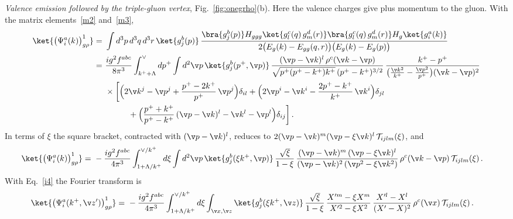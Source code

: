 \emph{Valence emission followed by the triple-gluon vertex}, Fig.~\ref{fig:onegrho}(b). Here the valence
charges give plus momentum to the gluon. With the matrix elements~\eqref{m2} and~\eqref{m3},
\begin{align}\label{onegrho1}
\ket{\big(\Psi^{a}_{i}(k)\big)^{1}_{g\rho}}
=\ &\int d^{3}p\,d^{3}q\,d^{3}r\,\ket{g^{b}_{j}(p)}\,
\frac{\bra{g^{b}_{j}(p)}H_{ggg}\ket{g^{c}_{l}(q)\,g^{d}_{m}(r)}\bra{g^{c}_{l}(q)\,g^{d}_{m}(r)}H_{g}\ket{g^{a}_{i}(k)}}
{2\big(E_{g}(k)-E_{gg}(q,r)\big)\big(E_{g}(k)-E_{g}(p)\big)}\\
=\ &\frac{ig^{2}f^{abc}}{8\pi^{3}}\int_{k^{+}+\Lambda}^{\vee}dp^{+}\int d^{2}\v p\,\ket{g^{b}_{j}(p^{+},\v p)}\,
\frac{(\v p-\v k)^{l}\,\rho^{c}(\v k-\v p)}{\sqrt{p^{+}(p^{+}-k^{+})k^{+}}\,(p^{+}-k^{+})^{3/2}}\,
\frac{k^{+}-p^{+}}{\big(\frac{\v k^{2}}{k^{+}}-\frac{\v p^{2}}{p^{+}}\big)(\v k-\v p)^{2}}\notag\\
&\times\bigg[\Big(2\v k^{j}-\v p^{j}+\frac{p^{+}-2k^{+}}{p^{+}}\,\v p^{j}\Big)\delta_{il}
+\Big(2\v p^{i}-\v k^{i}-\frac{2p^{+}-k^{+}}{k^{+}}\,\v k^{i}\Big)\delta_{jl}\notag\\
&\hspace{1cm}+\Big(\frac{p^{+}+k^{+}}{p^{+}-k^{+}}\,(\v p-\v k)^{l}-\v k^{l}-\v p^{l}\Big)\delta_{ij}\bigg]\,.\label{onegrho12}
\end{align}
In terms of $\xi$ the square bracket, contracted with $(\v p-\v k)^{l}$, reduces to
$2(\v p-\v k)^{m}(\v p-\xi\v k)^{l}\,\mathcal{T}_{ijlm}(\xi)$, and
\begin{align}\label{onegrho12xi}
\ket{\big(\Psi^{a}_{i}(k)\big)^{1}_{g\rho}}
=\ &-\frac{ig^{2}f^{abc}}{4\pi^{3}}\int_{1+\Lambda/k^{+}}^{\vee/k^{+}}d\xi\int d^{2}\v p\,
\ket{g^{b}_{j}(\xi k^{+},\v p)}\,\frac{\sqrt{\xi}}{1-\xi}\,
\frac{(\v p-\v k)^{m}\,(\v p-\xi\v k)^{l}}{(\v p-\v k)^{2}\,(\v p^{2}-\xi\v k^{2})}\,
\rho^{c}(\v k-\v p)\,\mathcal{T}_{ijlm}(\xi)\,.
\end{align}
With Eq.~\eqref{i4} the Fourier transform is
\begin{align}\label{Eq:onegrhoX1}
\ket{\big(\Psi^{a}_{i}(k^{+},\v z')\big)^{1}_{g\rho}}
=\ &-\frac{ig^{2}f^{abc}}{4\pi^{3}}\int_{1+\Lambda/k^{+}}^{\vee/k^{+}}d\xi\int_{\v x,\v z}
\ket{g^{b}_{j}(\xi k^{+},\v z)}\,\frac{\sqrt{\xi}}{1-\xi}\,
\frac{X'^{m}-\xi X^{m}}{X'^{2}-\xi X^{2}}\,\frac{X'^{l}-X^{l}}{(X'-X)^{2}}\,
\rho^{c}(\v x)\,\mathcal{T}_{ijlm}(\xi)\,.
\end{align}

